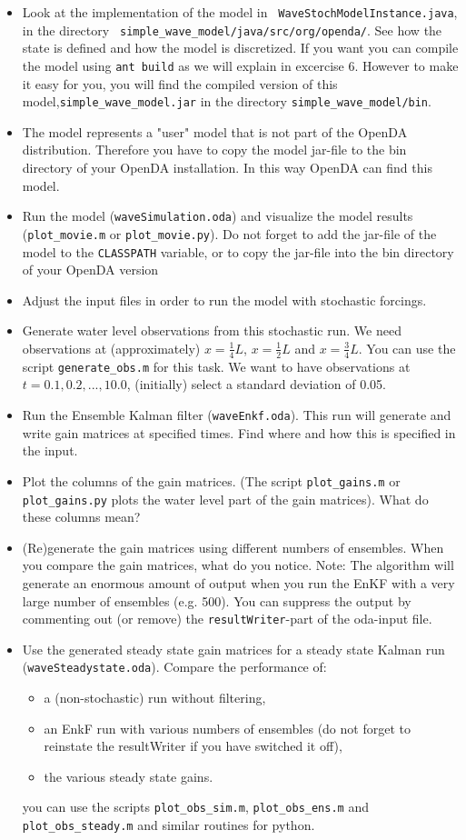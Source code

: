 \begin{itemize}
\item Look at the implementation of the model in {\tt
  WaveStochModelInstance.java}, in the directory {\tt
  simple\_wave\_model/java/src/org/openda/}. See how the state is defined and how
  the model is discretized. If you want you can compile the model using {\tt ant
  build} as we will explain in excercise 6. However to make it easy for you, you
  will find the compiled version of this model,{\tt simple\_wave\_model.jar} in
  the directory {\tt simple\_wave\_model/bin}.
\item The model represents a "user" model that is not part of the OpenDA distribution. Therefore you have to copy the
 model jar-file to the bin directory of your OpenDA installation. In this way OpenDA can find this model.
\item Run the model ({\tt waveSimulation.oda}) and visualize the model results
  ({\tt plot\_movie.m} or {\tt plot\_movie.py}). Do not forget to add the jar-file of the model to the
  {\tt CLASSPATH} variable, or to copy the jar-file into the bin directory of
  your OpenDA version
\item Adjust the input files in order to run the model with stochastic
  forcings.
\item Generate water level observations from this stochastic run. We need
  observations at (approximately) $x=\frac{1}{4} L$, $x=\frac{1}{2} L$ and
  $x=\frac{3}{4} L$. You can use the script {\tt generate\_obs.m} for this
  task. We want to have observations at $t=0.1, 0.2,...,10.0$, (initially)
  select a standard deviation of 0.05.
\item Run the Ensemble Kalman filter ({\tt waveEnkf.oda}). This run will
  generate and write gain matrices at specified times. Find where and how this
  is specified in the input.
\item Plot the columns of the gain matrices. (The script {\tt plot\_gains.m}
  or {\tt plot\_gains.py}
  plots the water level part of the gain matrices). What do these columns mean?
\item (Re)generate the gain matrices using different numbers of ensembles. When
  you compare the gain matrices, what do you notice. Note: The algorithm will
  generate an enormous amount of output when you run the EnKF with a very large
  number of ensembles (e.g. 500). You can suppress the output by commenting out
  (or remove) the {\tt resultWriter}-part of the oda-input file.
\item Use the generated steady state gain matrices for a steady state Kalman
  run ({\tt waveSteadystate.oda}). Compare the performance of:
  \begin{itemize}
  \item a (non-stochastic) run without filtering,
  \item an EnkF run with various numbers of ensembles (do not forget to
    reinstate the resultWriter if you have switched it off),
  \item the various steady state gains.
  \end{itemize}
 you can use the scripts {\tt plot\_obs\_sim.m}, {\tt plot\_obs\_ens.m}
 and\\ {\tt plot\_obs\_steady.m} and similar routines for python.


\end{itemize}
